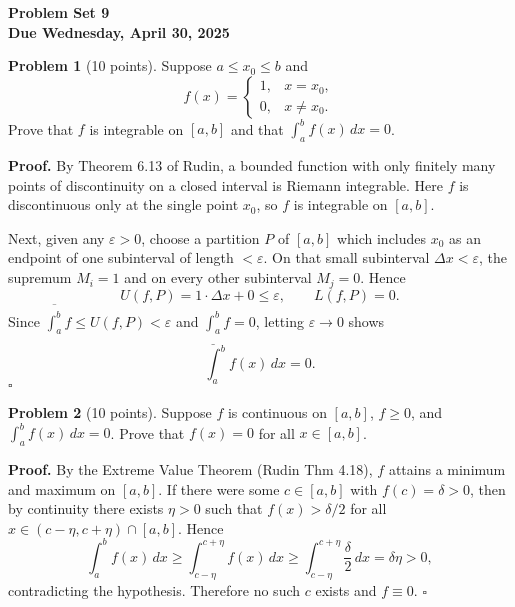 \documentclass[12pt,oneside]{article}
\theoremstyle{definition}
\newtheorem{problem}{Problem}
\begin{document}
\pagestyle{fancy}

\begin{center}
\bf \Large
Problem Set 9\\[0.5em]
\large
Due Wednesday, April 30, 2025
\end{center}

\bigskip

\begin{problem}[10 points]
Suppose $a \le x_0 \le b$ and
\[
f(x)=
\begin{cases}
1,&x=x_0,\\
0,&x\neq x_0.
\end{cases}
\]
Prove that $f$ is integrable on $[a,b]$ and that $\int_a^b f(x)\,dx=0$.
\end{problem}
\textbf{Proof.}
By Theorem 6.13 of Rudin, a bounded function with only finitely many points of discontinuity on a closed interval is Riemann integrable.  Here $f$ is discontinuous only at the single point $x_0$, so $f$ is integrable on $[a,b]$.

Next, given any $\varepsilon>0$, choose a partition $P$ of $[a,b]$ which includes $x_0$ as an endpoint of one subinterval of length $<\varepsilon$.  On that small subinterval $\Delta x<\varepsilon$, the supremum $M_i=1$ and on every other subinterval $M_j=0$.  Hence
\[
U(f,P)=1\cdot\Delta x+0\le\varepsilon,
\qquad
L(f,P)=0.
\]
Since $\overline{\int_a^b}f\le U(f,P)<\varepsilon$ and $\underline{\int_a^b}f=0$, letting $\varepsilon\to0$ shows
\[
\int_a^b f(x)\,dx=0.
\]
\hfill$\square$

\bigskip

\begin{problem}[10 points]
Suppose $f$ is continuous on $[a,b]$, $f\ge0$, and $\displaystyle\int_a^b f(x)\,dx=0$. Prove that $f(x)=0$ for all $x\in[a,b]$.
\end{problem}
\textbf{Proof.}
By the Extreme Value Theorem (Rudin Thm 4.18), $f$ attains a minimum and maximum on $[a,b]$.  If there were some $c\in[a,b]$ with $f(c)=\delta>0$, then by continuity there exists $\eta>0$ such that $f(x)>\delta/2$ for all $x\in(c-\eta,c+\eta)\cap[a,b]$.  Hence
\[
\int_a^b f(x)\,dx
\ge \int_{c-\eta}^{c+\eta} f(x)\,dx
\ge \int_{c-\eta}^{c+\eta}\!\frac\delta2\,dx
= \delta\eta >0,
\]
contradicting the hypothesis.  Therefore no such $c$ exists and $f\equiv0$.
\hfill$\square$

\bigskip
\end{document}
